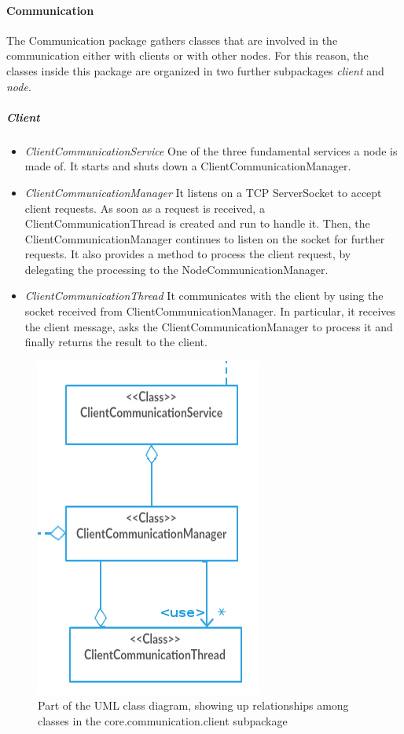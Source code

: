 \documentclass{article}
\begin{document}
\paragraph{Communication} The Communication package gathers classes that are involved in the communication either with clients or with other nodes. For this reason, the classes inside this package are organized in two further subpackages \textit{client} and \textit{node}. 
\subparagraph{Client} 
\begin{itemize}
\item \textit{ClientCommunicationService} One of the three fundamental services a node is made of. It starts and shuts down a ClientCommunicationManager.
\item \textit{ClientCommunicationManager} It listens on a TCP ServerSocket to accept client requests. As soon as a request is received, a ClientCommunicationThread is created and run to handle it. Then, the ClientCommunicationManager continues to listen on the socket for further requests. It also provides a method to process the client request, by delegating the processing to the NodeCommunicationManager.
\item \textit{ClientCommunicationThread} It communicates with the client by using the socket received from ClientCommunicationManager. In particular, it receives the client message, asks the ClientCommunicationManager to process it and finally returns the result to the client.
\end{itemize}
\begin{figure}[h]
\centering
\includegraphics[scale=0.35]{classes_client_subpackage}
\caption{Part of the UML class diagram, showing up relationships among classes in the core.communication.client subpackage}
\label{fig:class_diag_core.communication.client	}
\end{figure}
\end{document}

